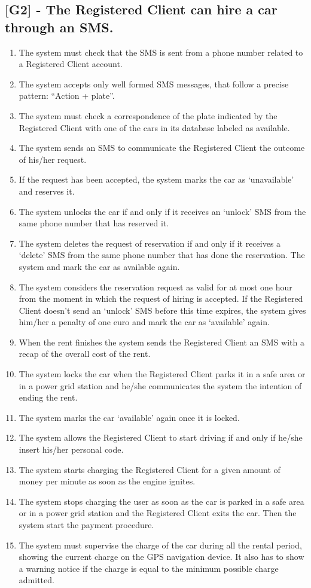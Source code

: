 \subsection{[G2] - The Registered Client can hire a car through an SMS.}
\begin{enumerate}[label=\textbf{R2.\arabic*)}]
\item The system must check that the SMS is sent from a phone number related to a Registered Client account.
\item The system accepts only well formed SMS messages, that follow a precise pattern: “Action + plate”.
\item The system must check a correspondence of the plate indicated by the Registered Client with one of the cars in its database labeled as available.
\item The system sends an SMS to communicate the Registered Client the outcome of his/her request.
\item If the request has been accepted, the system marks the car as ‘unavailable’ and reserves it.
\item The system unlocks the car if and only if it receives an ‘unlock’ SMS from  the same phone number that has reserved it.
\item The system deletes the request of reservation if and only if it receives a ‘delete’ SMS from the same phone number that has done the reservation. The system and mark the car as available again.
\item The system considers the reservation request as valid for at most one hour from the moment in which the request of hiring is accepted. If the Registered Client doesn’t send an ‘unlock’ SMS before this time expires, the system gives him/her a penalty of one euro and mark the car as ‘available’ again.
\item When the rent finishes the system sends the Registered Client an SMS with a recap of the overall cost of the rent.
\item The system locks the car when the Registered Client parks it in a safe area or in a power grid station and he/she communicates the system the intention of ending the rent.
\item The system marks the car ‘available’ again once it is locked.
\item The system allows the Registered Client to start driving if and only if he/she insert his/her personal code.
\item The system starts charging the Registered Client for a given amount of money per minute as soon as the engine ignites.
\item The system stops charging the user as soon as the car is parked in a safe area or in a power grid station and the Registered Client exits the car. Then the system start the payment procedure.
\item The system must supervise the charge of the car during all the rental period, showing the current charge on the GPS navigation device. It also has to show a warning notice if the charge is equal to the minimum possible charge admitted.
\end{enumerate}

